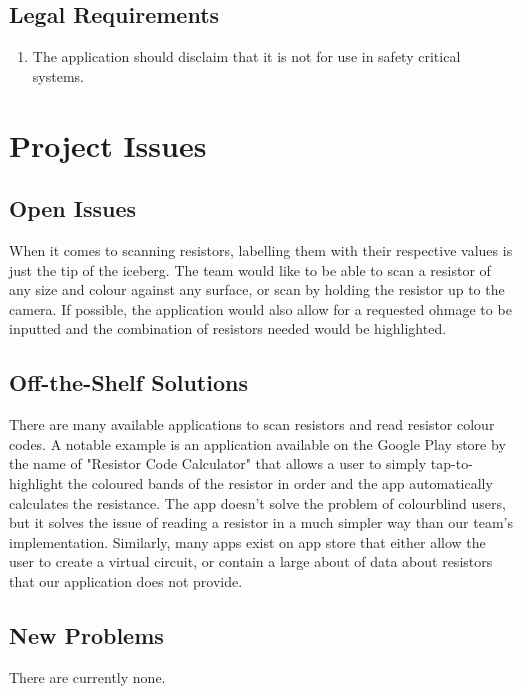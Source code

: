 \documentclass{article}
\begin{document}
\subsection{Legal Requirements}
\begin{enumerate}
\item The application should disclaim that it is not for use in safety critical systems.
\end{enumerate}

\section{Project Issues}

\subsection{Open Issues }
When it comes to scanning resistors, labelling them with their respective values is just the tip of the iceberg. The team would like to be able to scan a resistor of any size and colour against any surface, or scan by holding the resistor up to the camera. If possible, the application would also allow for a requested ohmage to be inputted and the combination of resistors needed would be highlighted.

\subsection{Off-the-Shelf Solutions}
There are many available applications to scan resistors and read resistor colour codes. A notable example is an application available on the Google Play store by the name of "Resistor Code Calculator" that allows a user to simply tap-to-highlight the coloured bands of the resistor in order and the app automatically calculates the resistance. The app doesn't solve the problem of colourblind users, but it solves the issue of reading a resistor in a much simpler way than our team's implementation. Similarly, many apps exist on app store that either allow the user to create a virtual circuit, or contain a large about of data about resistors that our application does not provide.

\subsection{New Problems}
There are currently none.
\end{document}
